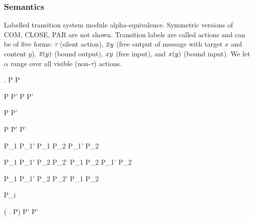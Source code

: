 \subsubsection{Semantics}

Labelled transition system module alpha-equivalence.
Symmetric versions of COM, CLOSE, PAR are not shown.
Transition labels are called actions and can be of five forms:
$\tau$ (silent action),
$\overline{x}y$ (free output of message with target $x$ and content $y$),
$\overline{x}(y)$ (bound output),
$xy$ (free input),
and $x(y)$ (bound input).
We let $\alpha$ range over all visible (non-$\tau$) actions.

  {  \anullproc}

  { . P  P}

  {P  P'}
  {P  P'}

  {P \apireduction{\alpha} P'}
  { \apireduction{\alpha} }

  {P  P'}
  {  P'}

  {P_1 \apireduction{\alpha} P_1'}
  {P_1 \apar P_2 \apireduction{\alpha} P_1' \apar P_2}

  {P_1  P_1'}
  {P_2  P_2'}
  {P_1 \apar P_2 \apireduction{\actsilent} P_1' \apar P_2}

  {P_1  P_1'}
  {P_2  P_2'}
  {P_1 \apar P_2 \apireduction{\actsilent} }

  { \apireduction{\actsilent} P_i}

  {( . P)
    \apireduction{\alpha} P'}
  { \apireduction{\alpha} P'}

